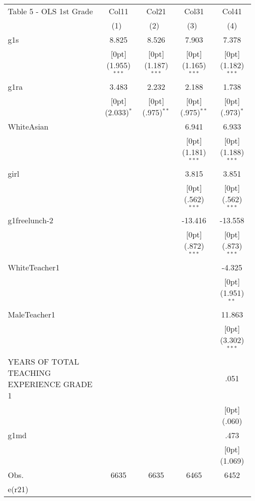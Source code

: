 \documentclass[a4paper,11pt]{article}
\begin{document}
\begin{table}
\small
\begin{tabular*}{\textwidth}{@{\extracolsep{\fill}}lcccc}				
	Table 5 - OLS 1st Grade & \multicolumn{1}{c}{Col11} &	\multicolumn{1}{c}{Col21} &	\multicolumn{1}{c}{Col31} &	\multicolumn{1}{c}{Col41} \\
	\cline{2-5}				
	& \multicolumn{1}{c}{(1)\mbox{\ }} &	\multicolumn{1}{c}{(2)\mbox{\ }} &	\multicolumn{1}{c}{(3)\mbox{\ }} &	\multicolumn{1}{c}{(4)} \\
	\hline				
	g1s &	8.825 &	8.526 &	7.903 &	7.378 \\
	&	\raisebox{.7ex}[0pt]{\scriptsize (1.955)$^{***}$} &	\raisebox{.7ex}[0pt]{\scriptsize (1.187)$^{***}$} &	\raisebox{.7ex}[0pt]{\scriptsize (1.165)$^{***}$} &	\raisebox{.7ex}[0pt]{\scriptsize (1.182)$^{***}$} \\
	g1ra &	3.483 &	2.232 &	2.188 &	1.738 \\
	&	\raisebox{.7ex}[0pt]{\scriptsize (2.033)$^{*}$} &	\raisebox{.7ex}[0pt]{\scriptsize (.975)$^{**}$} &	\raisebox{.7ex}[0pt]{\scriptsize (.975)$^{**}$} &	\raisebox{.7ex}[0pt]{\scriptsize (.973)$^{*}$} \\
	WhiteAsian &	&	&	6.941 &	6.933 \\
	&	&	&	\raisebox{.7ex}[0pt]{\scriptsize (1.181)$^{***}$} &	\raisebox{.7ex}[0pt]{\scriptsize (1.188)$^{***}$} \\
	girl &	&	&	3.815 &	3.851 \\
	&	&	&	\raisebox{.7ex}[0pt]{\scriptsize (.562)$^{***}$} &	\raisebox{.7ex}[0pt]{\scriptsize (.562)$^{***}$} \\
	g1freelunch-2 &	&	&	-13.416 &	-13.558 \\
	&	&	&	\raisebox{.7ex}[0pt]{\scriptsize (.872)$^{***}$} &	\raisebox{.7ex}[0pt]{\scriptsize (.873)$^{***}$} \\
	WhiteTeacher1 &	&	&	&	-4.325 \\
	&	&	&	&	\raisebox{.7ex}[0pt]{\scriptsize (1.951)$^{**}$} \\
	MaleTeacher1 &	&	&	&	11.863 \\
	&	&	&	&	\raisebox{.7ex}[0pt]{\scriptsize (3.302)$^{***}$} \\
	YEARS OF TOTAL TEACHING EXPERIENCE GRADE 1 &	&	&	&	.051 \\
	&	&	&	&	\raisebox{.7ex}[0pt]{\scriptsize (.060)} \\
	g1md &	&	&	&	.473 \\
	&	&	&	&	\raisebox{.7ex}[0pt]{\scriptsize (1.069)} \\
	Obs. &	6635 &	6635 &	6465 &	6452 \\
	e(r21) &	&	&	&	\\
	\hline\hline				
\end{tabular*}
\end{table}			
\end{document}
